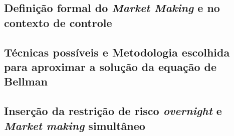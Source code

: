 \subsection{Definição formal do \textit{Market Making} e no contexto de controle}
\label{section:problem_description/definition}


\subsection{Técnicas possíveis e Metodologia escolhida para aproximar a solução da equação de Bellman}
\label{section:problem_description/techniques}


\subsection{Inserção da restrição de risco \textit{overnight} e \textit{Market making} simultâneo}
\label{section:problem_description/multivariate_mm}

